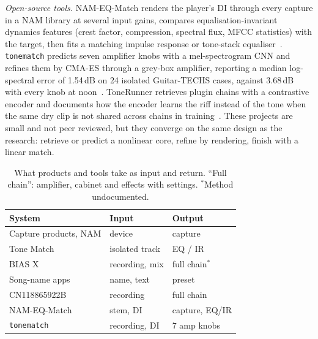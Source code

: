 \emph{Open-source tools.} NAM-EQ-Match renders the player's DI through every
capture in a NAM library at several input gains, compares equalisation-invariant
dynamics features (crest factor, compression, spectral flux, MFCC statistics)
with the target, then fits a matching impulse response or tone-stack
equaliser~\cite{sd4562026nameqmatch}. \texttt{tonematch} predicts seven
amplifier knobs with a mel-spectrogram CNN and refines them by CMA-ES through
a grey-box amplifier, reporting a median log-spectral error of 1.54\,dB on 24
isolated Guitar-TECHS cases, against 3.68\,dB with every knob at
noon~\cite{neuwirth2026tonematch}.
ToneRunner retrieves plugin chains with a contrastive encoder and documents
how the encoder learns the riff instead of the tone when the same dry clip is
not shared across chains in training~\cite{nathanben2026tonerunner}.
These projects are small and not peer reviewed, but they converge on the same
design as the research: retrieve or predict a nonlinear core, refine by
rendering, finish with a linear match.

\begin{table}[t]
\centering
\caption{What products and tools take as input and return. ``Full chain'':
amplifier, cabinet and effects with settings. $^*$Method undocumented.}
\label{tab:products}
\footnotesize
\setlength{\tabcolsep}{2.5pt}
\begin{tabular}{@{}lll@{}}
\toprule
System & Input & Output \\
\midrule
Capture products, NAM & device & capture \\
Tone Match~\cite{fractalndtonematch} & isolated track & EQ / IR \\
BIAS X~\cite{positivegridndbiasxhelp} & recording, mix & full chain$^*$ \\
Song-name apps~\cite{bouharb2026gptonebuilder} & name, text & preset \\
CN118865922B~\cite{huanyin2025presetpatent} & recording & full chain \\
NAM-EQ-Match~\cite{sd4562026nameqmatch} & stem, DI & capture, EQ/IR \\
\texttt{tonematch}~\cite{neuwirth2026tonematch} & recording, DI & 7 amp knobs \\
\bottomrule
\end{tabular}
\end{table}
